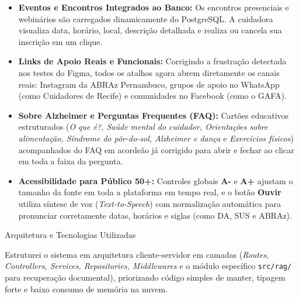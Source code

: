 \documentclass[11pt,a4paper]{article}
\newcommand{\tituloSecao}[1]{%
  \par\addvspace{12pt}%
  {\noindent\fontsize{20pt}{24pt}\selectfont\normalfont\color{headingBlue}#1\par}%
  \vspace{4pt}%
}
\begin{document}
\begin{itemize}[leftmargin=1.25cm, label=\textbullet, topsep=2pt, itemsep=6pt]
  \item \textbf{Eventos e Encontros Integrados ao Banco:} Os encontros presenciais e webinários são carregados dinamicamente do PostgreSQL. A cuidadora visualiza data, horário, local, descrição detalhada e realiza ou cancela sua inscrição em um clique.
  \item \textbf{Links de Apoio Reais e Funcionais:} Corrigindo a frustração detectada nos testes do Figma, todos os atalhos agora abrem diretamente os canais reais: Instagram da ABRAz Pernambuco, grupos de apoio no WhatsApp (como Cuidadores de Recife) e comunidades no Facebook (como o GAFA).
  \item \textbf{Sobre Alzheimer e Perguntas Frequentes (FAQ):} Cartões educativos estruturados (\textit{O que é?, Saúde mental do cuidador, Orientações sobre alimentação, Síndrome do pôr-do-sol, Alzheimer e dança} e \textit{Exercícios físicos}) acompanhados do FAQ em acordeão já corrigido para abrir e fechar ao clicar em toda a faixa da pergunta.
  \item \textbf{Acessibilidade para Público 50+:} Controles globais \textbf{A-} e \textbf{A+} ajustam o tamanho da fonte em toda a plataforma em tempo real, e o botão \textbf{Ouvir} utiliza síntese de voz (\textit{Text-to-Speech}) com normalização automática para pronunciar corretamente datas, horários e siglas (como DA, SUS e ABRAz).
\end{itemize}

\tituloSecao{Arquitetura e Tecnologias Utilizadas}

Estruturei o sistema em arquitetura cliente-servidor em camadas (\textit{Routes, Controllers, Services, Repositories, Middlewares} e o módulo específico \texttt{src/rag/} para recuperação documental), priorizando código simples de manter, tipagem forte e baixo consumo de memória na nuvem.
\end{document}
